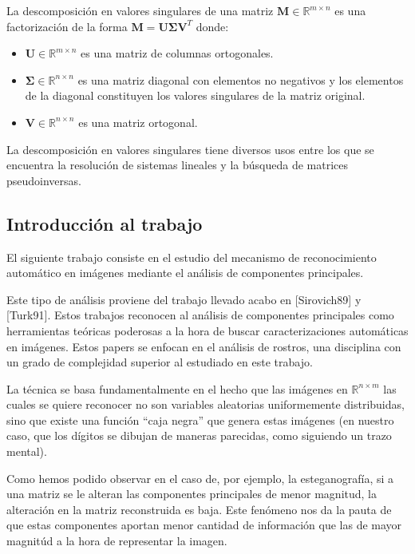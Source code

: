 La descomposici\'on en valores singulares de una matriz $\mathbf{M} \in \mathbb{R}^{m \times n}$ es una factorizaci\'on de la forma $\mathbf{M} =
\mathbf{U} \boldsymbol{\Sigma} \mathbf{V}^T$ donde:

\begin{itemize}
  \item $\mathbf{U} \in \mathbb{R}^{m \times n}$ es una matriz de columnas ortogonales.
  \item $\boldsymbol{\Sigma} \in \mathbb{R}^{n \times n}$ es una matriz diagonal con elementos no negativos y los elementos de la
diagonal constituyen los valores singulares de la matriz original.
  \item $\mathbf{V} \in \mathbb{R}^{n \times n}$ es una matriz ortogonal.
\end{itemize}

La descomposici\'on en valores singulares tiene diversos usos entre los que se encuentra la resoluci\'on de
sistemas lineales y la b\'usqueda de matrices pseudoinversas.

\subsection{Introducci\'on al trabajo}

El siguiente trabajo consiste en el estudio del mecanismo de reconocimiento autom\'atico
en im\'agenes mediante el an\'alisis de componentes principales.

Este tipo de an\'alisis proviene del trabajo llevado acabo en [Sirovich89] y [Turk91]. Estos
trabajos reconocen al an\'alisis de componentes principales como herramientas te\'oricas poderosas
a la hora de buscar caracterizaciones autom\'aticas en im\'agenes. Estos papers se enfocan en el
an\'alisis de rostros, una disciplina con un grado de complejidad superior al estudiado en este
trabajo.

La t\'ecnica se basa fundamentalmente en el hecho que las im\'agenes en $\mathbb{R}^{n \times m}$ las cuales se
quiere reconocer no son variables aleatorias uniformemente distribuidas, sino
que existe una funci\'on ``caja negra'' que genera estas im\'agenes (en nuestro 
caso, que los d\'igitos se dibujan de maneras parecidas, como siguiendo un trazo mental).

Como hemos podido observar en el caso de, por ejemplo, la esteganograf\'ia, si a una matriz se le alteran
las componentes principales de menor magnitud, la alteraci\'on en la matriz reconstruida es baja.
Este fen\'omeno nos da la pauta de que estas componentes aportan menor cantidad de informaci\'on
que las de mayor magnit\'ud a la hora de representar la imagen.

